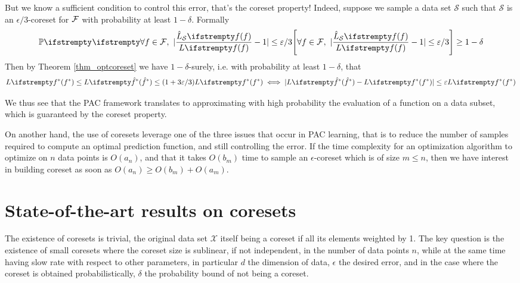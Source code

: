 But we know a sufficient condition to control this error, that's the coreset property! Indeed, suppose we sample a data set $\mathcal{S}$ such that $\mathcal{S}$ is an $\epsilon/3$-coreset for $\mathcal{F}$ with probability at least $1-\delta$. Formally
\begin{equation*}
    \PP{}{\forall f \in \qset,\ |\frac{\estloss{\mathcal{S}}{\query}}{\loss{\query}} - 1| \leq \epsilon/3} \geq 1- \delta
\end{equation*}
Then by Theorem \ref{thm_optcoreset} we have $1-\delta$-surely, i.e. with probability at least $1-\delta$, that
\begin{equation*}
    \loss{\query^*} \leq \loss{\hat\query^*} \leq (1+ 3 \epsilon/3) \loss{\query^*} \iff
    |\loss{\hat\query^*} - \loss{\query^*}| \leq \epsilon \loss{\query^*}
\end{equation*}

We thus see that the PAC framework translates to approximating with high probability the evaluation of a function on a data subset, which is guaranteed by the coreset property. 

On another hand, the use of coresets leverage one of the three issues that occur in PAC learning, that is to reduce the number of samples required to compute an optimal prediction function, and still controlling the error. If the time complexity for an optimization algorithm to optimize on $n$ data points is $O(a_n)$, and that it takes $O(b_m)$ time to sample an $\epsilon$-coreset which is of size $m \le n$, then we have interest in building coreset as soon as $O(a_n) \geq O(b_m) + O(a_m)$.





    

\section{State-of-the-art results on coresets}
The existence of coresets is trivial, the original data set $\mathcal{X}$ itself  being a coreset if all its elements weighted by 1. The key question is the existence of small coresets where the coreset size is sublinear, if not independent, in the number of data points $n$, while at the same time having slow rate with respect to other parameters, in particular $d$ the dimension of data, $\epsilon$ the desired error, and in the case where the coreset is obtained probabilistically, $\delta$ the probability bound of not being a coreset.


